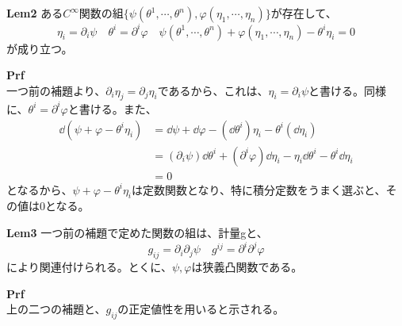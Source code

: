 \documentclass[a4paper,11pt]{jsarticle}
\numberwithin{equation}{section}
\begin{document}
    
    \begin{itembox}[l]{\textbf{Lem2}}
        ある$C^{\infty}$関数の組$\{\psi(\theta^1,\cdots,\theta^n),\varphi(\eta_1,\cdots,\eta_n)\}$が存在して、
        \begin{equation}
            \eta_i = \partial_i \psi \quad \theta^i = \partial^i \varphi \quad \psi(\theta^1,\cdots,\theta^n) + \varphi(\eta_1,\cdots,\eta_n) - \theta^i\eta_i = 0
        \end{equation}
        が成り立つ。
    \end{itembox}
    \textbf{Prf}\\
    一つ前の補題より、$\partial_i \eta_j = \partial_j \eta_i$であるから、これは、$\eta_i = \partial_i \psi$と書ける。同様に、$\theta^i = \partial^i \varphi$と書ける。また、
    \begin{align}
        \dd (\psi + \varphi - \theta^i\eta_i) &= \dd \psi + \dd \varphi - (\dd \theta^i)\eta_i - \theta^i(\dd \eta_i) \\
        &=(\partial_i \psi )\dd \theta^i + (\partial^i \varphi)\dd \eta_i - \eta_i \dd \theta^i - \theta^i \dd \eta_i \\
        &=0
    \end{align}
    となるから、$\psi + \varphi - \theta^i\eta_i$は定数関数となり、特に積分定数をうまく選ぶと、その値は0となる。\hfill\qedsymbol
    
    \begin{itembox}[l]{\textbf{Lem3}}
        一つ前の補題で定めた関数の組は、計量gと、
        \begin{equation}
            g_{ij} = \partial_i \partial_j \psi \quad g^{ij} = \partial^i \partial^j \varphi
        \end{equation}
        により関連付けられる。とくに、$\psi,\varphi$は狭義凸関数である。
    \end{itembox}
    \textbf{Prf}\\
    上の二つの補題と、$g_{ij}$の正定値性を用いると示される。\hfill\qedsymbol
    
\end{document}
